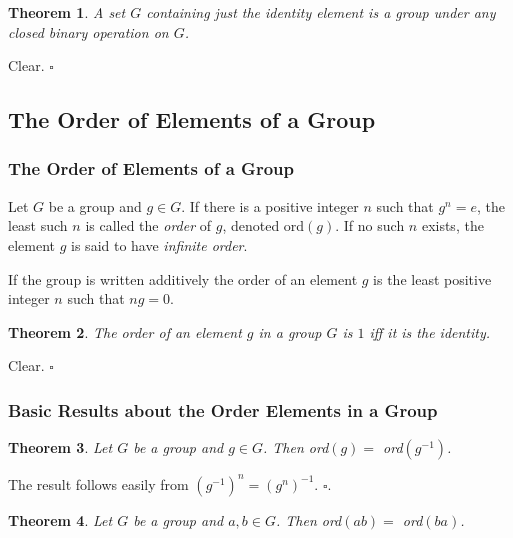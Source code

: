 \documentclass[10pt]{article}
\newtheorem{theorem}{Theorem}[section]
\newenvironment{proof}[1][Proof]{\begin{trivlist}
\item[\hskip \labelsep {\itshape #1}]}{\end{trivlist}}
\newenvironment{definition}[1][Definition]{\begin{trivlist}
\item[\hskip \labelsep {\bfseries #1}]}{\end{trivlist}}
\begin{document}
\begin{theorem}
A set $G$ containing just the identity element is a group under any closed binary operation on $G$.
\end{theorem}

\begin{proof}
Clear. $\square$
\end{proof}

\subsection{The Order of Elements of a Group}

\subsubsection{The Order of Elements of a Group}

\begin{definition}
Let $G$ be a group and $g \in G$. If there is a positive integer $n$ such that $g^n = e$, the least such $n$ is called the \emph{order} of $g$, denoted ord$(g)$. If no such $n$ exists, the element $g$ is said to have \emph{infinite order}.
\end{definition}

If the group is written additively the order of an element $g$ is the least positive integer $n$ such that $ng = 0$.

\begin{theorem}
The order of an element $g$ in a group $G$ is $1$ iff it is the identity.
\end{theorem}

\begin{proof}
Clear. $\square$
\end{proof}

\subsubsection{Basic Results about the Order Elements in a Group}

\begin{theorem}
Let $G$ be a group and $g \in G$. Then ord$(g) =$ ord$(g^{-1})$.
\end{theorem}

\begin{proof}
The result follows easily from $(g^{-1})^n = (g^n)^{-1}$. $\square$.
\end{proof}

\begin{theorem}
Let $G$ be a group and $a, b \in G$. Then ord$(ab) =$ ord$(ba)$. 
\end{theorem}
\end{document}
